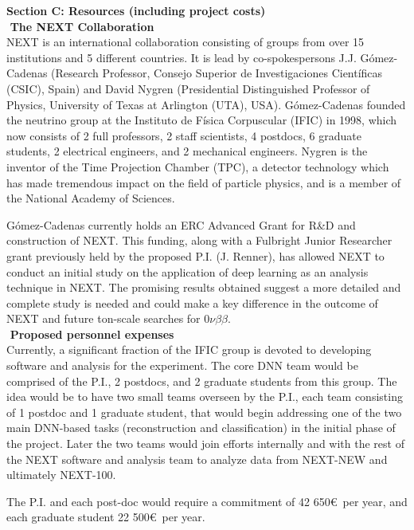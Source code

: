 \documentclass[11pt,a4paper]{article}
\begin{document}
{\noindent\textbf{Section C: Resources (including project costs)}}\\

\noindent\textbf{\textbullet\,\,The NEXT Collaboration}\\
NEXT is an international collaboration consisting of groups from over 15 institutions and 5 different countries. It is lead by co-spokespersons J.J. G\'{o}mez-Cadenas (Research Professor, Consejo Superior de Investigaciones Cient\'{i}ficas (CSIC), Spain) and David Nygren (Presidential Distinguished Professor of Physics, University of Texas at Arlington (UTA), USA). G\'{o}mez-Cadenas founded the neutrino group at the Instituto de F\'{i}sica Corpuscular (IFIC) in 1998, which now consists of 2 full professors, 2 staff scientists, 4 postdocs, 6 graduate students, 2 electrical engineers, and 2 mechanical engineers. Nygren is the inventor of the Time Projection Chamber (TPC), a detector technology which has made tremendous impact on the field of particle physics, and is a member of the National Academy of Sciences.

G\'{o}mez-Cadenas currently holds an ERC Advanced Grant for R\&D and construction of NEXT. This funding, along with a Fulbright Junior Researcher grant previously held by the proposed P.I. (J. Renner), has allowed NEXT to conduct an initial study on the application of deep learning as an analysis technique in NEXT. The promising results obtained suggest a more detailed and complete study is needed and could make a key difference in the outcome of NEXT and future ton-scale searches for $0\nu\beta\beta$.\\

\noindent\textbf{\textbullet\,\,Proposed personnel expenses}\\
Currently, a significant fraction of the IFIC group is devoted to developing software and analysis for the experiment. The core DNN team would be comprised of the P.I., 2 postdocs, and 2 graduate students from this group. The idea would be to have two small teams overseen by the P.I., each team consisting of 1 postdoc and 1 graduate student, that would begin addressing one of the two main DNN-based tasks (reconstruction and classification) in the initial phase of the project. Later the two teams would join efforts internally and with the rest of the NEXT software and analysis team to analyze data from NEXT-NEW and ultimately NEXT-100.

The P.I. and each post-doc would require a commitment of 42 650\euro ~per year, and each graduate student 22 500\euro ~per year.\\
\end{document}

